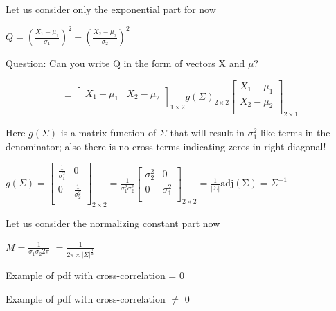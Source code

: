 \documentclass{beamer}
\begin{document}
\begin{frame}

Let us consider only the exponential part for now

$ Q =  \left(\frac{X_1-\mu_1}{\sigma_1}\right)^2 + \left(\frac{X_2-\mu_2}{\sigma_2}\right)^2 $

Question: Can you write Q in the form of vectors X and $\mu$?

$$
 = \begin{bmatrix}
	X_1 - \mu_1 &
	X_2 - \mu_2 \\
\end{bmatrix}_{1\times2}  g(\Sigma)_{2\times2} \begin{bmatrix}
X_1 - \mu_1 \\
X_2 - \mu_2 \\
\end{bmatrix}_{2\times1}
$$

Here $g(\Sigma)$ is a matrix function of $\Sigma$ that will result in $\sigma_1^2$ like terms in the denominator; also there is no cross-terms indicating zeros in right diagonal!

$g(\Sigma) = \begin{bmatrix}
 \frac{1}{\sigma_1^2}& 0  \\
 0 &  \frac{1}{\sigma_2^2} \\
\end{bmatrix}_{2\times2} = \frac{1}{\sigma_1^2 \sigma_2^2}\begin{bmatrix}
{\sigma_2^2}& 0  \\
0 &  {\sigma_1^2}   \\ 
\end{bmatrix}_{2\times2} = \frac{1}{|\Sigma|} \operatorname{adj(\Sigma)} = \Sigma^{-1}$

\end{frame}


\begin{frame}
Let us consider the normalizing constant part now

$M = \frac{1}{\sigma_1 \sigma_2 2\pi }$
$=\frac{1}{2\pi \times |\Sigma|^{\frac{1}{2}}}$
\end{frame}


\begin{frame}{Example of pdf with cross-correlation  = 0}

\end{frame}

\begin{frame}{Example of pdf with cross-correlation  $\neq$ 0}

\end{frame}
\end{document}
